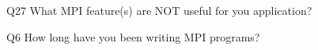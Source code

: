 \begin{description}%
\item{Q27} What MPI feature(s) are NOT useful for you application?%
\item{Q6} How long have you been writing MPI programs?%
\end{description}%
